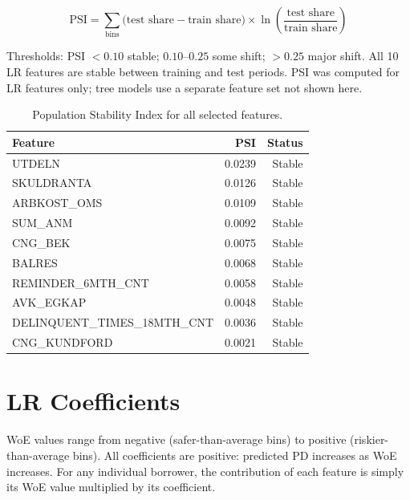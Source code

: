 \documentclass[a4paper,11pt]{article}
\begin{document}
\[
  \text{PSI} = \sum_{\text{bins}}
  \bigl(\text{test share} - \text{train share}\bigr)
  \times \ln\!\left(\frac{\text{test share}}{\text{train share}}\right)
\]

Thresholds: PSI $< 0.10$ stable; $0.10$--$0.25$ some shift; $> 0.25$ major shift.
All 10 LR features are stable between training and test periods. PSI was computed
for LR features only; tree models use a separate feature set not shown here.

\begin{table}[H]
\centering
\begin{tabular}{lrr}
\toprule
\textbf{Feature} & \textbf{PSI} & \textbf{Status} \\
\midrule
UTDELN                     & 0.0239 & Stable \\
SKULDRANTA                 & 0.0126 & Stable \\
ARBKOST\_OMS               & 0.0109 & Stable \\
SUM\_ANM                   & 0.0092 & Stable \\
CNG\_BEK                   & 0.0075 & Stable \\
BALRES                     & 0.0068 & Stable \\
REMINDER\_6MTH\_CNT        & 0.0058 & Stable \\
AVK\_EGKAP                 & 0.0048 & Stable \\
DELINQUENT\_TIMES\_18MTH\_CNT & 0.0036 & Stable \\
CNG\_KUNDFORD              & 0.0021 & Stable \\
\bottomrule
\end{tabular}
\caption{Population Stability Index for all selected features.}
\end{table}

\section{LR Coefficients}

WoE values range from negative (safer-than-average bins) to positive
(riskier-than-average bins). All coefficients are positive: predicted PD increases
as WoE increases. For any individual borrower, the contribution of each feature is
simply its WoE value multiplied by its coefficient.
\end{document}
